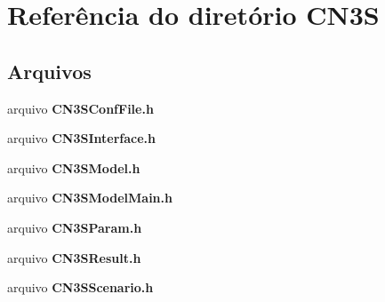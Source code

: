 \section{Referência do diretório C\+N3S}
\label{dir_231c38bada193ed87d009f44d3d54285}
\subsection*{Arquivos}
\begin{DoxyCompactItemize}
\item 
arquivo {\bf C\+N3\+S\+Conf\+File.\+h}
\item 
arquivo {\bf C\+N3\+S\+Interface.\+h}
\item 
arquivo {\bf C\+N3\+S\+Model.\+h}
\item 
arquivo {\bf C\+N3\+S\+Model\+Main.\+h}
\item 
arquivo {\bf C\+N3\+S\+Param.\+h}
\item 
arquivo {\bf C\+N3\+S\+Result.\+h}
\item 
arquivo {\bf C\+N3\+S\+Scenario.\+h}
\end{DoxyCompactItemize}
